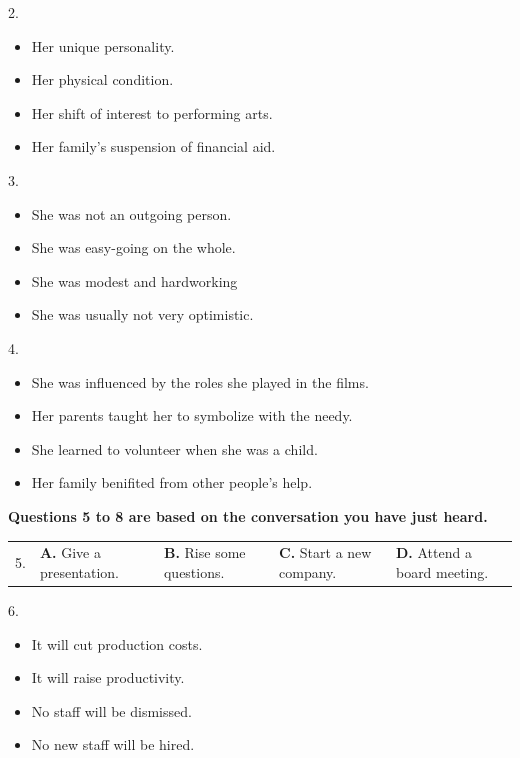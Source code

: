 \documentclass[UTF8,11pt]{ctexart}
\begin{document}
2.


\begin{itemize}[leftmargin=2em,itemsep=.2em,topsep=.4em]\item[A.] Her unique personality.
\item[B.] Her physical condition.
\item[C.] Her shift of interest to performing arts.
\item[D.] Her family’s suspension of financial aid.
\end{itemize}

3.


\begin{itemize}[leftmargin=2em,itemsep=.2em,topsep=.4em]\item[A.] She was not an outgoing person.
\item[B.] She was easy-going on the whole.
\item[C.] She was modest and hardworking
\item[D.] She was usually not very optimistic.
\end{itemize}

4.


\begin{itemize}[leftmargin=2em,itemsep=.2em,topsep=.4em]\item[A.] She was influenced by the roles she played in the films.
\item[B.] Her parents taught her to symbolize with the needy.
\item[C.] She learned to volunteer when she was a child.
\item[D.] Her family benifited from other people’s help.
\end{itemize}

\textbf{Questions 5 to 8 are based on the conversation you have just heard.}


\noindent\begin{tabularx}{\linewidth}{@{}lXXXX@{}}5. & \textbf{A.} Give a presentation. & \textbf{B.} Rise some questions. & \textbf{C.} Start a new company. & \textbf{D.} Attend a board meeting.\\\end{tabularx}\par

6.


\begin{itemize}[leftmargin=2em,itemsep=.2em,topsep=.4em]\item[A.] It will cut production costs.
\item[B.] It will raise productivity.
\item[C.] No staff will be dismissed.
\item[D.] No new staff will be hired.
\end{itemize}
\end{document}
